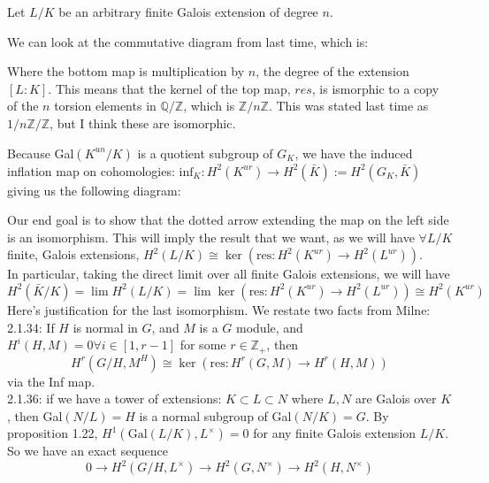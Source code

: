 \documentclass[class=article, crop=false]{standalone}
\begin{document}
Let $L/K$ be an arbitrary finite Galois extension of degree $n$. 

We can look at the commutative diagram from last time, which is: 

\begin{center}
\end{center}

Where the bottom map is multiplication by $n$, the degree of the extension $[L:K]$. This means that the kernel of the top map, $res$, is ismorphic to a copy of the $n$ torsion elements in $\mathbb{Q}/\mathbb{Z}$, which is $\mathbb{Z}/n\mathbb{Z}$. This was stated last time as $1/n\mathbb{Z}/\mathbb{Z}$, but I think these are isomorphic. 

Because Gal$(K^{un}/K)$ is a quotient subgroup of $G_K$, we have the induced inflation map on cohomologies: $\text{inf}_K:H^2(K^{ur})\rightarrow H^2(\bar{K}):=H^2(G_K,\bar{K})$ giving us the following diagram: 

\begin{center}
\end{center}

Our end goal is to show that the dotted arrow extending the map on the left side is an isomorphism. This will imply the result that we want, as we will have $\forall L/K$ finite, Galois extensions, $H^2(L/K)\cong \ker(\text{res}: H^2(K^{ur})\rightarrow H^2(L^{ur}))$.\\
In particular, taking the direct limit over all finite Galois extensions, we will have $$H^2(\bar{K}/K)=\lim H^2(L/K)=\lim \ker(\text{res}: H^2(K^{ur})\rightarrow H^2(L^{ur})) \cong H^2(K^{ur})$$ Here's justification for the last isomorphism. We restate two facts from Milne: \\
2.1.34: If $H$ is normal in $G$, and $M$ is a $G$ module, and $H^i(H, M)=0 \forall i\in [1, r-1]$ for some $r\in\mathbb{Z}_+$, then
$$H^r(G/H, M^H)\cong \ker(\text{res}:H^r(G,M)\rightarrow H^r(H,M))$$ via the Inf map. \\
2.1.36: if we have a tower of extensions: $K\subset L\subset N$ where $L, N$ are Galois over $K$, then Gal$(N/L)=H$ is a normal subgroup of Gal$(N/K)=G$. By proposition 1.22, $H^1(\text{Gal}(L/K), L^\times)=0$ for any finite Galois extension $L/K$. So we have an exact sequence
$$0\rightarrow H^2(G/H, L^\times)\rightarrow H^2(G, N^\times)\rightarrow H^2(H, N^\times)$$
\end{document}

